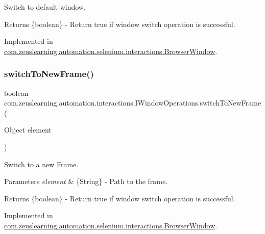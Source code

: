 Switch to default window.

\begin{DoxyReturn}{Returns}
\{boolean\} -\/ Return {\ttfamily true} if window switch operation is successful. 
\end{DoxyReturn}


Implemented in \hyperlink{classcom_1_1zeuslearning_1_1automation_1_1selenium_1_1interactions_1_1BrowserWindow_a4579549812a37d3984bda3e5facb2a2d}{com.\+zeuslearning.\+automation.\+selenium.\+interactions.\+Browser\+Window}.

\hypertarget{interfacecom_1_1zeuslearning_1_1automation_1_1interactions_1_1IWindowOperations_a9d922d36597fad9aa9e9eb79fb334efe}{}\label{interfacecom_1_1zeuslearning_1_1automation_1_1interactions_1_1IWindowOperations_a9d922d36597fad9aa9e9eb79fb334efe} 
\subsubsection{\texorpdfstring{switch\+To\+New\+Frame()}{switchToNewFrame()}\hspace{0.1cm}{\footnotesize\ttfamily [1/2]}}
{\footnotesize\ttfamily boolean com.\+zeuslearning.\+automation.\+interactions.\+I\+Window\+Operations.\+switch\+To\+New\+Frame (\begin{DoxyParamCaption}\item[{Object}]{element }\end{DoxyParamCaption})}

Switch to a new Frame.


\begin{DoxyParams}{Parameters}
{\em element} & \{String\} -\/ Path to the frame. \\
\hline
\end{DoxyParams}
\begin{DoxyReturn}{Returns}
\{boolean\} -\/ Return {\ttfamily true} if window switch operation is successful. 
\end{DoxyReturn}


Implemented in \hyperlink{classcom_1_1zeuslearning_1_1automation_1_1selenium_1_1interactions_1_1BrowserWindow_ae6c8f6ecf277ac9da4d262eff3147403}{com.\+zeuslearning.\+automation.\+selenium.\+interactions.\+Browser\+Window}.

